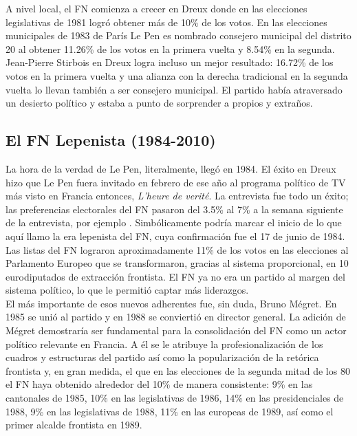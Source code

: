 A nivel local, el FN comienza a crecer en Dreux donde en las elecciones legislativas de 1981 logró obtener más de 10\% de los votos. En las elecciones municipales de 1983 de París Le Pen es nombrado consejero municipal del distrito 20 al obtener 11.26\% de los votos en la primera vuelta y 8.54\% en la segunda. Jean-Pierre Stirbois en Dreux logra incluso un mejor resultado: 16.72\% de los votos en la primera vuelta y una alianza con la derecha tradicional en la segunda vuelta lo llevan también a ser consejero municipal. El partido había atraversado un desierto político y estaba a punto de sorprender a propios y extraños.

\subsection{El FN Lepenista (1984-2010)}

La hora de la verdad de Le Pen, literalmente, llegó en 1984. El éxito en Dreux hizo que Le Pen fuera invitado en febrero de ese año al programa político de TV más visto en Francia entonces, \textit{L'heure de verité}. La entrevista fue todo un éxito; las preferencias electorales del FN pasaron del 3.5\% al 7\% a la semana siguiente de la entrevista, por ejemplo \parencite{Stockemer17}. Simbólicamente podría marcar el inicio de lo que aquí llamo la era lepenista del FN, cuya confirmación fue el 17 de junio de 1984. Las listas del FN lograron aproximadamente 11\% de los votos en las elecciones al Parlamento Europeo que se transformaron, gracias al sistema proporcional, en 10 eurodiputados de extracción frontista. El FN ya no era un partido al margen del sistema político, lo que le permitió captar más liderazgos.\\ 

El más importante de esos nuevos adherentes fue, sin duda, Bruno Mégret. En 1985 se unió al partido y en 1988 se conviertió en director general. La adición de Mégret demostraría ser fundamental para la consolidación del FN como un actor político relevante en Francia. A él se le atribuye la profesionalización de los cuadros y estructuras del partido así como la popularización de la retórica frontista y, en gran medida, el que en las elecciones de la segunda mitad de los 80 el FN haya obtenido alrededor del 10\% de manera consistente: 9\% en las cantonales de 1985, 10\% en las legislativas de 1986, 14\% en las presidenciales de 1988, 9\% en las legislativas de 1988, 11\% en las europeas de 1989, así como el primer alcalde frontista en 1989.\\ 

